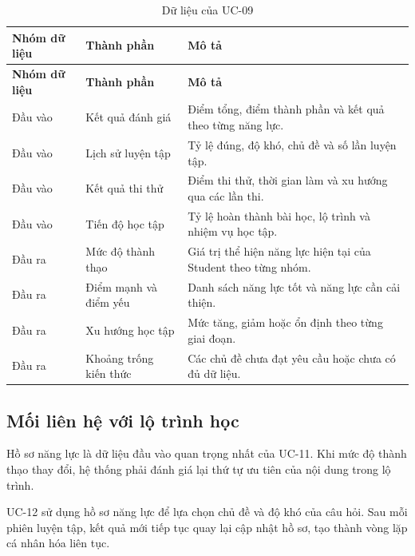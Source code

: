 \begin{longtable}{|p{3.5cm}|p{5.3cm}|p{5.6cm}|}
	\caption{Dữ liệu của UC-09}
	\label{tab:uc09-data}\\
	\hline
	\textbf{Nhóm dữ liệu} &
	\textbf{Thành phần} &
	\textbf{Mô tả} \\
	\hline
	\endfirsthead
	
	\hline
	\textbf{Nhóm dữ liệu} &
	\textbf{Thành phần} &
	\textbf{Mô tả} \\
	\hline
	\endhead
	
	Đầu vào &
	Kết quả đánh giá &
	Điểm tổng, điểm thành phần và kết quả theo từng năng lực. \\
	\hline
	
	Đầu vào &
	Lịch sử luyện tập &
	Tỷ lệ đúng, độ khó, chủ đề và số lần luyện tập. \\
	\hline
	
	Đầu vào &
	Kết quả thi thử &
	Điểm thi thử, thời gian làm và xu hướng qua các lần thi. \\
	\hline
	
	Đầu vào &
	Tiến độ học tập &
	Tỷ lệ hoàn thành bài học, lộ trình và nhiệm vụ học tập. \\
	\hline
	
	Đầu ra &
	Mức độ thành thạo &
	Giá trị thể hiện năng lực hiện tại của Student theo từng nhóm. \\
	\hline
	
	Đầu ra &
	Điểm mạnh và điểm yếu &
	Danh sách năng lực tốt và năng lực cần cải thiện. \\
	\hline
	
	Đầu ra &
	Xu hướng học tập &
	Mức tăng, giảm hoặc ổn định theo từng giai đoạn. \\
	\hline
	
	Đầu ra &
	Khoảng trống kiến thức &
	Các chủ đề chưa đạt yêu cầu hoặc chưa có đủ dữ liệu. \\
	\hline
	
\end{longtable}

\subsection{Mối liên hệ với lộ trình học}

Hồ sơ năng lực là dữ liệu đầu vào quan trọng nhất của UC-11. Khi mức độ
thành thạo thay đổi, hệ thống phải đánh giá lại thứ tự ưu tiên của nội
dung trong lộ trình.

UC-12 sử dụng hồ sơ năng lực để lựa chọn chủ đề và độ khó của câu hỏi.
Sau mỗi phiên luyện tập, kết quả mới tiếp tục quay lại cập nhật hồ sơ,
tạo thành vòng lặp cá nhân hóa liên tục.

